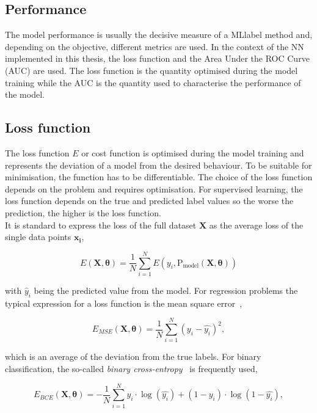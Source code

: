\subsection{Performance}

The model performance is usually the decisive measure of a \acrshort{MLlabel} method and, depending on the objective, different metrics are used. In the context of the NN implemented in this thesis, the loss function and the Area Under the ROC Curve (AUC) are used. The loss function is the quantity optimised during the model training while the AUC is the quantity used to characterise the performance of the model.

\subsection{Loss function}

The loss function $E$ or cost function is optimised during the model training and represents the deviation of a model from the desired behaviour. To be suitable for minimisation, the function has to be differentiable. The choice of the loss function depends on the problem and requires optimisation. For supervised learning, the loss function depends on the true and predicted label values so the worse the prediction, the higher is the loss function.\\

It is standard to express the loss of the full dataset $\mathbf{X}$ as the average loss of the single data points $\mathbf{x_i}$,

\begin{equation}
    E(\mathbf{X},\boldsymbol{\theta})=\frac{1}{N}\sum_{i=1}^NE(y_i,\text{P}_\text{model}(\mathbf{X},\boldsymbol{\theta}))
\end{equation}

with $\hat{y}_i$ being the predicted value from the model. For regression problems the typical expression for a loss function is the mean square error~\cite{EncyclopediaofML}, 

\begin{equation}
    E_{MSE}(\mathbf{X},\boldsymbol{\theta}) = \frac{1}{N}\sum_{i=1}^N (y_i-\hat{y_i})^2,
\end{equation}

which is an average of the deviation from the true labels. For binary classification, the so-called \textit{binary cross-entropy}~\cite{binarycross} is frequently used, 

\begin{equation}
    E_{BCE}(\mathbf{X},\boldsymbol{\theta}) = -\frac{1}{N}\sum_{i=1}^N y_i\cdot\log(\hat{y_i})+(1-y_i)\cdot\log(1-\hat{y_i}),
\end{equation}

